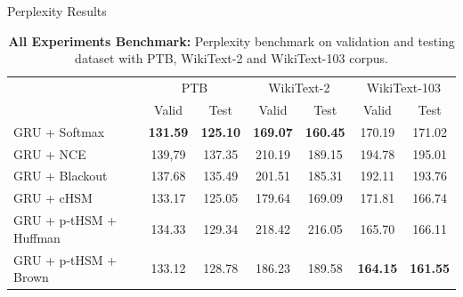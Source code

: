 \documentclass[final,t,unknownkeysallowed]{beamer}
\begin{document}
\begin{frame}{}
\begin{columns}[t]
\begin{column}{.3\linewidth}
\begin{block}{Perplexity Results}
\begin{table}
  \centering
  \caption{\textbf{All Experiments Benchmark:} Perplexity benchmark on validation and testing dataset with PTB, WikiText-2 and WikiText-103 corpus.}
\begin{tabular}{lcccccc}
  \toprule
  & \multicolumn{2}{c}{PTB} & \multicolumn{2}{c}{WikiText-2} & \multicolumn{2}{c}{WikiText-103} \\
  \cmidrule(lr){2-3} \cmidrule(lr){4-5} \cmidrule(lr){6-7}
  & Valid & Test& Valid & Test  & Valid & Test \\ \midrule
  GRU + Softmax                                             &\textbf{131.59}&\textbf{125.10} &\textbf{169.07}&\textbf{160.45}&170.19&171.02\\
  GRU + NCE             &139,79&137.35 &210.19&189.15&194.78&195.01\\
  GRU + Blackout          &137.68&135.49 &201.51&185.31&192.11&193.76\\
  GRU + cHSM                  &133.17&125.05 &179.64&169.09&171.81&166.74\\  \midrule
  GRU + p-tHSM + Huffman &134.33&129.34 &218.42&216.05& 165.70&166.11\\
GRU + p-tHSM + Brown &133.12&128.78       &186.23&189.58 &\textbf{164.15}& \textbf{161.55} \\
  \bottomrule
\end{tabular}
\end{table}
      \end{block}

      
    \end{column}
  \end{columns}
\end{frame}
\end{document}
